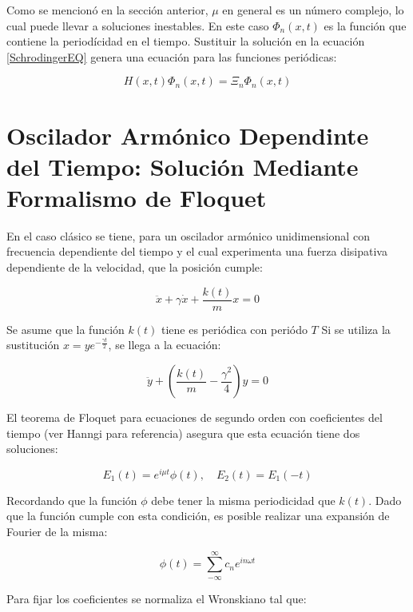 \documentclass[a4paper,10pt]{report}
\begin{document}
Como se mencionó en la sección anterior, $\mu$ en general es un número complejo, lo cual puede llevar a soluciones inestables. En este caso $\Phi_n(x,t)$ es la función que contiene la periodícidad en el tiempo. Sustituir la solución en la ecuación \ref{SchrodingerEQ} genera una ecuación para las funciones periódicas:

\begin{equation}
H(x,t)\Phi_n(x,t)=\Xi_n\Phi_n(x,t)
\end{equation}

\section{Oscilador Armónico Dependinte del Tiempo: Solución Mediante Formalismo de Floquet}

En el caso clásico \cite{HanngiFM} se tiene, para un oscilador armónico unidimensional con frecuencia dependiente del tiempo y el cual experimenta una fuerza disipativa dependiente de la velocidad, que la posición cumple:

\begin{equation}
\ddot{x}+\gamma\dot{x}+\frac{k(t)}{m}x=0
\end{equation}

Se asume que la función $k(t)$ tiene es periódica con periódo $T$ Si se utiliza la sustitución $x=ye^{-\frac{\gamma t}{2}}$, se llega a la ecuación:

\begin{equation}
\ddot{y} +(\frac{k(t)}{m}-\frac{\gamma^2}{4})y=0
\end{equation}

El teorema de Floquet para ecuaciones de segundo orden con coeficientes del tiempo (ver Hanngi para referencia) asegura que esta ecuación tiene dos soluciones:


\begin{equation}
E_1(t) = e^{i\mu t}\phi(t), \quad E_2(t)=E_1(-t)
\end{equation}

Recordando que la función $\phi$ debe tener la misma periodicidad que $k(t)$. Dado que la función cumple con esta condición, es posible realizar una expansión de Fourier \cite{ArfkenMM} de la misma:

\begin{equation}
\phi(t) = \sum_{-\infty}^\infty c_n e^{in\omega t}
\end{equation}

Para fijar los coeficientes se normaliza el Wronskiano tal que:
\end{document}

